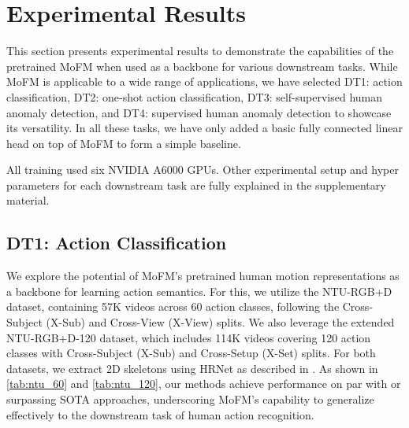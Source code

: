 \section{Experimental Results}
\label{sec:results}

This section presents experimental results to demonstrate the capabilities of the pretrained MoFM when used as a backbone for various downstream tasks. While MoFM is applicable to a wide range of applications, we have selected DT1: action classification, DT2: one-shot action classification, DT3: self-supervised human anomaly detection, and DT4: supervised human anomaly detection to showcase its versatility. In all these tasks, we have only added a basic fully connected linear head on top of MoFM to form a simple baseline. 

All training used six NVIDIA A6000 GPUs. Other experimental setup and hyper parameters for each downstream task are fully explained in the supplementary material.



\subsection{DT1: Action Classification} \label{sec:dt1}
We explore the potential of MoFM’s pretrained human motion representations as a backbone for learning action semantics. For this, we utilize the NTU-RGB+D \cite{ntu60Paper} dataset, containing 57K videos across 60 action classes, following the Cross-Subject (X-Sub) and Cross-View (X-View) splits. We also leverage the extended NTU-RGB+D-120 \cite{ntu120paper} dataset, which includes 114K videos covering 120 action classes with Cross-Subject (X-Sub) and Cross-Setup (X-Set) splits. For both datasets, we extract 2D skeletons using HRNet \cite{hrnet} as described in \cite{PoseConv3D}. As shown in \cref{tab:ntu_60} and \cref{tab:ntu_120}, our methods achieve performance on par with or surpassing SOTA approaches, underscoring MoFM’s capability to generalize effectively to the downstream task of human action recognition.



